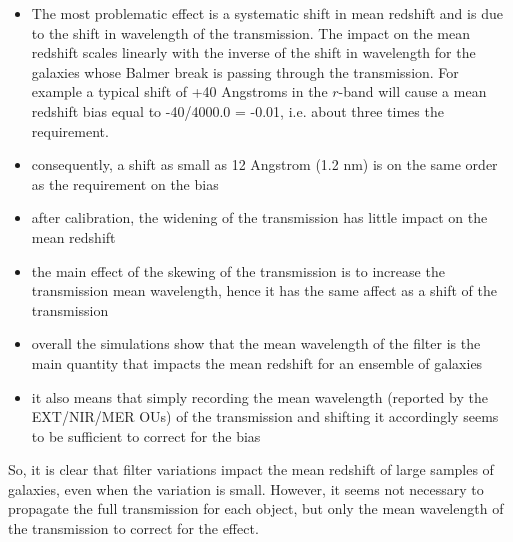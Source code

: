 \documentclass[11pt]{article}
\begin{document}
\begin{itemize}
\item
  The most problematic effect is a systematic shift in mean redshift and
  is due to the shift in wavelength of the transmission. The impact on
  the mean redshift scales linearly with the inverse of the shift in
  wavelength for the galaxies whose Balmer break is passing through the
  transmission. For example a typical shift of +40 Angstroms in the
  \(r\)-band will cause a mean redshift bias equal to -40/4000.0 =
  -0.01, i.e. about three times the requirement.
\item
  consequently, a shift as small as 12 Angstrom (1.2 nm) is on the same
  order as the requirement on the bias
\item
  after calibration, the widening of the transmission has little impact
  on the mean redshift
\item
  the main effect of the skewing of the transmission is to increase the
  transmission mean wavelength, hence it has the same affect as a shift
  of the transmission
\item
  overall the simulations show that the mean wavelength of the filter is
  the main quantity that impacts the mean redshift for an ensemble of
  galaxies
\item
  it also means that simply recording the mean wavelength (reported by
  the EXT/NIR/MER OUs) of the transmission and shifting it accordingly
  seems to be sufficient to correct for the bias
\end{itemize}

So, it is clear that filter variations impact the mean redshift of large
samples of galaxies, even when the variation is small. However, it seems
not necessary to propagate the full transmission for each object, but
only the mean wavelength of the transmission to correct for the effect.


    
    
    
    
\end{document}
